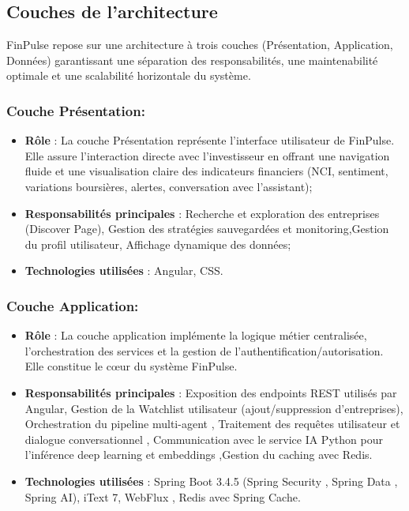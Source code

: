 \subsection{Couches de l'architecture}
FinPulse repose sur une architecture à trois couches (Présentation, Application, Données) garantissant une séparation des responsabilités, une maintenabilité optimale et une scalabilité horizontale du système.
\subsubsection*{Couche Présentation:}
\begin{itemize}
    \item \textbf{Rôle} : La couche Présentation représente l’interface utilisateur de FinPulse. Elle assure l’interaction directe avec l’investisseur en offrant une navigation fluide et une visualisation claire des indicateurs financiers (NCI, sentiment, variations boursières, alertes, conversation avec l'assistant);
    \item \textbf{Responsabilités principales} :  Recherche et exploration des entreprises (Discover Page), Gestion des stratégies sauvegardées et monitoring,Gestion du profil utilisateur, Affichage dynamique des données;
    \item \textbf{Technologies utilisées} : Angular, CSS.
\end{itemize}

\subsubsection*{Couche Application:}
\begin{itemize}
    \item \textbf{Rôle} :  La couche application implémente la logique métier centralisée, l'orchestration des services et la gestion de l'authentification/autorisation. Elle constitue le cœur du système FinPulse.
    \item \textbf{Responsabilités principales} : Exposition des endpoints REST utilisés par Angular, Gestion de la Watchlist utilisateur (ajout/suppression d’entreprises), Orchestration du pipeline multi-agent , Traitement des requêtes utilisateur et dialogue conversationnel , Communication avec le service IA Python pour l’inférence deep learning et embeddings ,Gestion du caching avec Redis.

    \item \textbf{Technologies utilisées} : Spring Boot 3.4.5 (Spring Security , Spring Data , Spring AI), iText 7, WebFlux , Redis avec Spring Cache.

\end{itemize}
